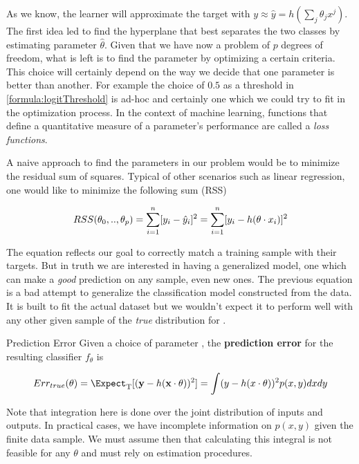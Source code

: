 
As we know, the learner will approximate the target with $y \approx \hat{y} = h\left(\sum_{j}\theta_j x^j\right)$. The first idea led to find the hyperplane that best separates the two classes by estimating parameter $\hat{\theta}$. Given that we have now a problem of $p$ degrees of freedom, what is left is to find the parameter by optimizing a certain criteria. This choice will certainly depend on the way we decide that one parameter is better than another. For example the choice of $0.5$ as a threshold in \ref{formula:logitThreshold} is ad-hoc and certainly one which we could try to fit in the optimization process. In the context of machine learning, functions that define a quantitative measure of a parameter's performance  are called a \textit{loss functions}.

A naive approach to find the parameters in our problem would be to minimize the residual sum of squares. Typical of other scenarios such as linear regression, one would like to minimize the following sum (RSS)  

\begin{equation} \label{eq:rss}
RSS(\theta_0,..,\theta_p)  = \sum_{i=1}^n [y_i - \hat{y}_i]^2  \\
=  \sum_{i=1}^n [y_i - h( \theta \cdot x_i)]^2
\end{equation}

The equation reflects our goal to correctly match a training sample with their targets. But in truth we are interested in having a generalized model, one which can make a \textit{good} prediction on any sample, even new ones. The previous equation is a bad attempt to generalize the classification model constructed from the data. It is built to fit the actual dataset but we wouldn't expect it to perform well with any other given sample of the \textit{true} distribution for . 

\begin{definition}{Prediction Error}
Given a choice of parameter \theta, the \textbf{prediction error} for the resulting classifier $f_\theta$ is

\[
    Err_{true}(\theta)  = \Expect_{ \mathrm{T}}[(\textbf{y} - h(\textbf{x} \cdot \theta) )^2] \\
    = \int (y - h(x \cdot \theta) )^2 p(x,y)dxdy
\]
\end{definition}

Note that integration here is done over the joint distribution of inputs and outputs. In practical cases, we have incomplete information on $p(x,y)$ given the finite data sample.
We must assume then that calculating this integral is not feasible for any $\theta$ and must rely on estimation procedures.

